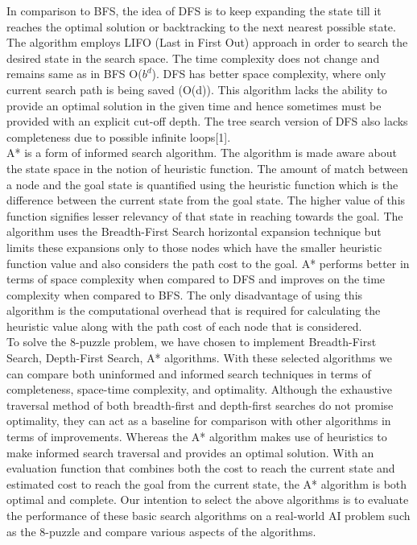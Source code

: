 \documentclass{svproc}
\begin{document}
\noindent In comparison to BFS, the idea of DFS is to keep expanding the state till it reaches the optimal solution or backtracking to the next nearest possible state. The algorithm employs LIFO (Last in First Out) approach in order to search the desired state in the search space. The time complexity does not change and remains same as in BFS O($b^{d}$). DFS has better space complexity, where only current search path is being saved (O(d)). This algorithm lacks the ability to provide an optimal solution in the given time and hence sometimes must be provided with an explicit cut-off depth.  The tree search version of DFS also lacks completeness due to possible infinite loops[1].\\

\noindent A* is a form of informed search algorithm. The algorithm is made aware about the state space in the notion of heuristic function. The amount of match between a node and the goal state is quantified using the heuristic function which is the difference between the current state from the goal state. The higher value of this function signifies lesser relevancy of that state in reaching towards the goal. The algorithm uses the Breadth-First Search horizontal expansion technique but limits these expansions only to those nodes which have the smaller heuristic function value and also considers the path cost to the goal. A* performs better in terms of space complexity when compared to DFS  and  improves on the time complexity  when compared to BFS. The only disadvantage of using this algorithm is the computational overhead that is required for calculating the heuristic value along with the path cost of each node that is considered.\\

\noindent To solve the 8-puzzle problem, we have chosen to implement Breadth-First Search, Depth-First Search, A* algorithms. With these selected algorithms we can compare both uninformed and informed search techniques in terms of completeness, space-time complexity, and optimality. Although the exhaustive traversal method of both breadth-first and depth-first searches do not promise optimality, they can act as a baseline for comparison with other algorithms in terms of improvements. Whereas the A* algorithm makes use of heuristics to make informed search traversal and provides an optimal solution. With an evaluation function that combines both the cost to reach the current state and estimated cost to reach the goal from the current state, the A* algorithm is both optimal and complete. Our intention to select the above algorithms is to evaluate the performance of these basic search algorithms on a real-world AI problem such as the 8-puzzle and compare various aspects of the algorithms.\\
\end{document}
